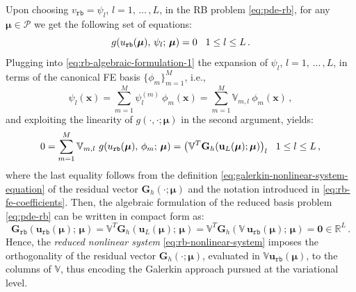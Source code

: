 \documentclass[12pt, a4paper, twoside, openright]{report}
\numberwithin{equation}{chapter}
\theoremstyle{theorem}
\theoremstyle{definition}
\theoremstyle{remark}
\theoremstyle{proposition}
\numberwithin{figure}{chapter}
\newcommand{\bg}[1]{\boldsymbol{#1}}
\begin{document}
		Upon choosing $v_{\texttt{rb}} = \psi_l$, $l = 1, \, \ldots \, , L$, in the RB problem \eqref{eq:pde-rb}, for any $\bg{\mu} \in \mathcal{P}$ we get the following set of equations:
		\begin{equation}
			\label{eq:rb-algebraic-formulation-1}
			g(u_{\texttt{rb}}(\bg{\mu}), \, \psi_l; \, \bg{\mu}) = 0 \hspace*{0.3cm} 1 \leq l \leq L \, .
		\end{equation}
		Plugging into \eqref{eq:rb-algebraic-formulation-1} the expansion of $\psi_l$, $l = 1, \, \ldots \, , L$, in terms of the canonical FE basis $\big\lbrace \phi_m \big\rbrace_{m = 1}^M$, i.e.,
		\begin{equation*}
			\psi_l(\bg{x}) = \sum_{m = 1}^M \psi_l^{(m)} ~ \phi_m(\bg{x}) = \sum_{m = 1}^M \mathbb{V}_{m,l} ~ \phi_m(\bg{x}) \, ,
		\end{equation*} 
		and exploiting the linearity of $g(\cdot,\cdot; \bg{\mu})$ in the second argument, yields:
		\begin{equation*}
			0 = \sum_{m = 1}^M \mathbb{V}_{m,l} ~ g(u_{\texttt{rb}}(\bg{\mu}), \, \phi_m; \, \bg{\mu}) = \big( \mathbb{V}^T \mathbf{G}_h(\mathbf{u}_L(\bg{\mu}); \bg{\mu}) \big)_l \hspace*{0.3cm} 1 \leq l \leq L \, ,
		\end{equation*}
		where the last equality follows from the definition \eqref{eq:galerkin-nonlinear-system-equation} of the residual vector $\mathbf{G}_h(\cdot; \bg{\mu})$ and the notation introduced in \eqref{eq:rb-fe-coefficients}. Then, the algebraic formulation of the reduced basis problem \eqref{eq:pde-rb} can be written in compact form as:
		\begin{equation}
			\label{eq:rb-nonlinear-system}
			\mathbf{G}_{\texttt{rb}}(\mathbf{u}_{\texttt{rb}}(\bg{\mu}); \, \bg{\mu}) = \mathbb{V}^T \mathbf{G}_h(\mathbf{u}_L(\bg{\mu}); \, \bg{\mu}) = \mathbb{V}^T \mathbf{G}_h(\mathbb{V} ~ \mathbf{u}_{\texttt{rb}}(\bg{\mu}); \, \bg{\mu}) = \bg{0} \in \mathbb{R}^L \, .
		\end{equation}
		Hence, the \emph{reduced nonlinear system} \eqref{eq:rb-nonlinear-system} imposes the orthogonality of the residual vector $\mathbf{G}_h(\cdot; \bg{\mu})$, evaluated in $\mathbb{V} \mathbf{u}_{\texttt{rb}}(\bg{\mu})$, to the columns of $\mathbb{V}$, thus encoding the Galerkin approach pursued at the variational level.
		
\end{document}

